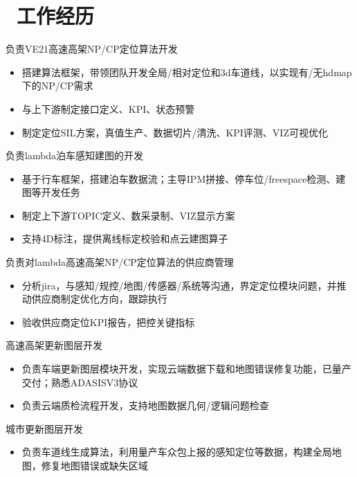 \documentclass{resume}
\begin{document}
\section{\faUsers\ 工作经历}
\begin{onehalfspacing}
  负责VE21高速高架NP/CP定位算法开发
  \begin{itemize}
    \item {搭建算法框架，带领团队开发全局/相对定位和3d车道线，以实现有/无hdmap下的NP/CP需求}
    \item 与上下游制定接口定义、KPI、状态预警
    \item 制定定位SIL方案，真值生产、数据切片/清洗、KPI评测、VIZ可视优化
  \end{itemize}
  负责lambda泊车感知建图的开发
  \begin{itemize}
    \item {基于行车框架，搭建泊车数据流；主导IPM拼接、停车位/freespace检测、建图等开发任务}
    \item 制定上下游TOPIC定义、数采录制、VIZ显示方案
    \item 支持4D标注，提供离线标定校验和点云建图算子
  \end{itemize}
  负责对lambda高速高架NP/CP定位算法的供应商管理
  \begin{itemize}
    \item {分析jira，与感知/规控/地图/传感器/系统等沟通，界定定位模块问题，并推动供应商制定优化方向，跟踪执行}
    \item 验收供应商定位KPI报告，把控关键指标
  \end{itemize}
\end{onehalfspacing}

\begin{onehalfspacing}
  高速高架更新图层开发
  \begin{itemize}
    \item {负责车端更新图层模块开发，实现云端数据下载和地图错误修复功能，已量产交付；熟悉ADASISV3协议}
    \item 负责云端质检流程开发，支持地图数据几何/逻辑问题检查
  \end{itemize}

  城市更新图层开发
  \begin{itemize}
    \item 负责车道线生成算法，利用量产车众包上报的感知定位等数据，构建全局地图，修复地图错误或缺失区域
  \end{itemize}
\end{onehalfspacing}
\end{document}
